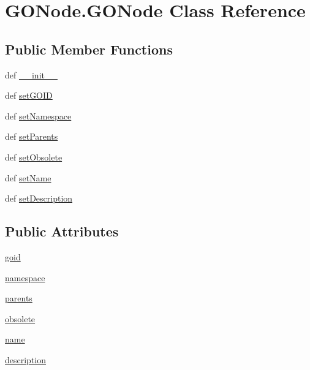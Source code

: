 \hypertarget{class_g_o_node_1_1_g_o_node}{
\section{GONode.GONode Class Reference}
\label{class_g_o_node_1_1_g_o_node}
}
\subsection*{Public Member Functions}
\begin{DoxyCompactItemize}
\item 
def \hyperlink{class_g_o_node_1_1_g_o_node_aed2500c2cbac29cc9793c37396b75928}{\_\-\_\-init\_\-\_\-}
\item 
def \hyperlink{class_g_o_node_1_1_g_o_node_a7bc51e25200c46ad8a7557992f90f7ca}{setGOID}
\item 
def \hyperlink{class_g_o_node_1_1_g_o_node_a0590505c8573df5ef3b6e8290e821de1}{setNamespace}
\item 
def \hyperlink{class_g_o_node_1_1_g_o_node_adf32cb452b5eff47a658d83ef9ce9381}{setParents}
\item 
def \hyperlink{class_g_o_node_1_1_g_o_node_a038f04eff9f5d8486280bc70887515fa}{setObsolete}
\item 
def \hyperlink{class_g_o_node_1_1_g_o_node_ab48dc024009773f22884b5a7c75d17cd}{setName}
\item 
def \hyperlink{class_g_o_node_1_1_g_o_node_a6da2fec8371255c0728c3bed095ab4f9}{setDescription}
\end{DoxyCompactItemize}
\subsection*{Public Attributes}
\begin{DoxyCompactItemize}
\item 
\hyperlink{class_g_o_node_1_1_g_o_node_a419738231e6061c8f35c7038600045b5}{goid}
\item 
\hyperlink{class_g_o_node_1_1_g_o_node_a14d769d661d7dad68b451d0ee40dc7c8}{namespace}
\item 
\hyperlink{class_g_o_node_1_1_g_o_node_a0e5b6b8b5e9b4a88ff0752017d90f544}{parents}
\item 
\hyperlink{class_g_o_node_1_1_g_o_node_a21c9f4840075c55ca91a59d4e7907f1f}{obsolete}
\item 
\hyperlink{class_g_o_node_1_1_g_o_node_a18b00948dd27ef1af426a1b8a522467d}{name}
\item 
\hyperlink{class_g_o_node_1_1_g_o_node_ad22366488d580d7aa91527f0b592d64d}{description}
\end{DoxyCompactItemize}


